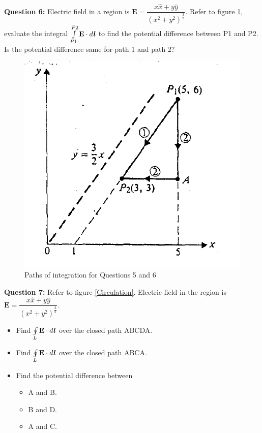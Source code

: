 \documentclass[12pt,a4paper]{article}
\begin{document}
\noindent\textbf{Question 6:} Electric field in a region is $\textbf{E}=\dfrac{x\hat x+y\hat y}{(x^2+y^2)^{\frac{3}{2}}}$. Refer to figure \ref{Cheng-integral}, evaluate the integral $\int\limits_{P1}^{P2}\textbf{E}\cdot d\textbf{\textit{l}}$ to find the potential difference between P1 and P2. Is the potential difference same for path 1 and path 2?
\begin{figure}[H]
\centering
\includegraphics[scale=0.6]{Figure2-10Cheng.png}
\caption{Paths of integration for Questions 5 and 6 \cite[Figure 2--10, page 23]{Cheng}}
\label{Cheng-integral}
\end{figure}
\noindent\textbf{Question 7:} Refer to figure \ref{Circulation}. Electric field in the region is $\textbf{E}=\dfrac{x\hat x+y\hat y}{(x^2+y^2)^\frac{3}{2}}$.
\begin{itemize}
\item[(a)] Find $\oint\limits_L \textbf{E}\cdot d\textbf{\textit{l}}$ over the closed path ABCDA.
\item[(b)] Find $\oint\limits_L \textbf{E}\cdot d\textbf{\textit{l}}$ over the closed path ABCA.
\item[(c)] Find the potential difference between
\begin{itemize}
\item[(1)] A and B.
\item[(2)] B and D.
\item[(3)] A and C.
\end{itemize}
\end{itemize}
\end{document}
